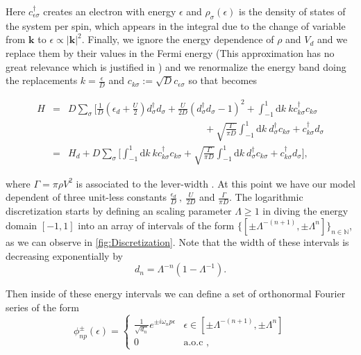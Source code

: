 Here $c_{\epsilon\sigma}^{\dagger}$ creates an electron with energy
$\epsilon$ and $\rho_{\sigma}(\epsilon)$ is the density of states
of the system per spin, which appears in the integral due to the change
of variable from $\mathbf{k}$ to $\epsilon\propto\left|\mathbf{k}\right|^{2}.$
Finally, we ignore the energy dependence of $\rho$ and $V_{d}$ and
we replace them by their values in the Fermi energy (This approximation
has no great relevance which is justified in \citep{krishna-murthy_renormalization-group_1980})
and we renormalize the energy band doing the replacements $k=\frac{\epsilon}{D}$
and $c_{k\sigma}:=\sqrt{D}c_{\epsilon\sigma}$ so that 
becomes

\begin{eqnarray}
H & = & D\sum_{\sigma}\Biggl[\frac{1}{D}\left(\epsilon_{d}+\frac{U}{2}\right)d_{\sigma}^{\dagger}d_{\sigma}+\frac{U}{2D}(d_{\sigma}^{\dagger}d_{\sigma}-1)^{2}+\int_{-1}^{1}\mbox{d}k\ kc_{k\sigma}^{\dagger}c_{k\sigma}\nonumber \\
 &  & \qquad\qquad\qquad\qquad\qquad\qquad\qquad+\sqrt{\frac{\Gamma}{\pi D}}\int_{-1}^{1}\mbox{d}k\ d_{\sigma}^{\dagger}c_{k\sigma}+c_{k\sigma}^{\dagger}d_{\sigma}\label{eq:Norm-HamEnergy}\\
 & = & H_{d}+D\sum_{\sigma}\Biggl[\int_{-1}^{1}\mbox{d}k\ kc_{k\sigma}^{\dagger}c_{k\sigma}+\sqrt{\frac{\Gamma}{\pi D}}\int_{-1}^{1}\mbox{d}k\ d_{\sigma}^{\dagger}c_{k\sigma}+c_{k\sigma}^{\dagger}d_{\sigma}\Biggr],
\end{eqnarray}


where $\Gamma=\pi\rho V^{2}$ is associated to the lever-width \citep[(3.5)]{sindel_numerical_2005}.
At this point we have our model dependent of three unit-less constants
$\frac{\epsilon_{d}}{D}\ ,\ \frac{U}{2D}$ and $\frac{\Gamma}{\pi D}$.
The logarithmic discretization starts by defining an scaling parameter
$\Lambda\geq1$ in diving the energy domain $[-1,1]$ into an array
of intervals of the form $\{[\pm\Lambda^{-(n+1)},\pm\Lambda^{n}]\}_{n\in\mathbb{N}}$,
as we can observe in \ref{fig:Discretization}. Note that the width
of these intervals is decreasing exponentially by 
\[
d_{n}=\Lambda^{-n}\left(1-\Lambda^{-1}\right).
\]


Then inside of these energy intervals we can define a set of orthonormal
Fourier series of the form
\begin{equation}
\phi_{np}^{\pm}(\epsilon)=\begin{cases}
\frac{1}{\sqrt{d_{n}}}e^{\pm i\omega_{n}p\epsilon} & \epsilon\in[\pm\Lambda^{-(n+1)},\pm\Lambda^{n}]\\
0 & \mbox{a.o.c },
\end{cases}\label{eq:orthonormal-Fourier}
\end{equation}


